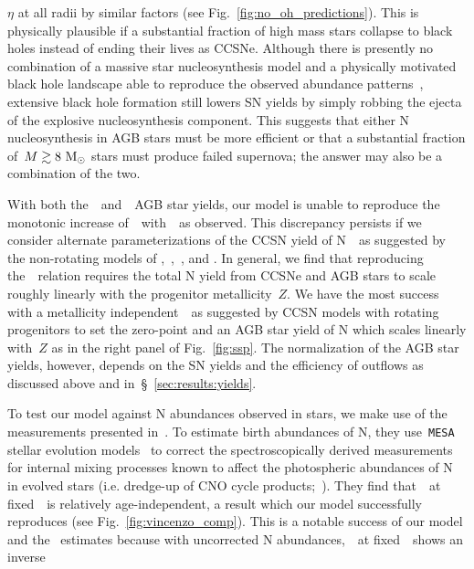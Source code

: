 \documentclass[ms.tex]{subfiles}
\begin{document}
$\eta$ at all radii by similar factors (see Fig.~\ref{fig:no_oh_predictions}).
This is physically plausible if a substantial fraction of high mass stars
collapse to black holes instead of ending their lives as CCSNe.
Although there is presently no combination of a massive star nucleosynthesis
model and a physically motivated black hole landscape able to reproduce the
observed abundance patterns~\citep{Griffith2021a}, extensive black hole
formation still lowers SN yields by simply robbing the ejecta of the explosive
nucleosynthesis component.
This suggests that either N nucleosynthesis in AGB stars must be more efficient 
or that a substantial fraction of~$M \gtrsim 8~\text{M}_\odot$ stars must produce
failed supernova; the answer may also be a combination of the two.
\par
With both the~\karakasten~and~\karakas~AGB star yields, our model is
unable to reproduce the monotonic increase of~\no~with~\oh~as observed.
This discrepancy persists if we consider alternate parameterizations of the
CCSN yield of N~~as suggested by the non-rotating models of
\citet{Woosley1995},~\citet{Nomoto2013},~\citet{Sukhbold2016}, and
\citet{Limongi2018}.
In general, we find that reproducing the~\ohno~relation requires the total N
yield from CCSNe and AGB stars to scale roughly linearly with the progenitor
metallicity~$Z$.
We have the most success with a metallicity independent~~as suggested
by CCSN models with rotating progenitors to set the zero-point and an AGB
star yield of N which scales linearly with~$Z$ as in the right panel of
Fig.~\ref{fig:ssp}.
The normalization of the AGB star yields, however, depends on the SN yields and
the efficiency of outflows as discussed above and
in~\S~\ref{sec:results:yields}.
\par
To test our model against N abundances observed in stars, we make use of the
measurements presented in~\citet{Vincenzo2021}.
To estimate birth abundances of N, they use~\texttt{MESA} stellar evolution
models~\citep{Paxton2011, Paxton2013, Paxton2015, Paxton2018} to correct the
spectroscopically derived measurements for internal mixing processes known to
affect the photospheric abundances of N in evolved stars (i.e. dredge-up of
CNO cycle products;~\citealp{Gilroy1989, Korn2007, Lind2008, Souto2018,
Souto2019}).
They find that~\no~at fixed~\feh~is relatively age-independent, a result
which our model successfully reproduces (see Fig.~\ref{fig:vincenzo_comp}).
This is a notable success of our model and the~\citet{Vincenzo2021} estimates
because with uncorrected N abundances,~\no~at fixed~\feh~shows an inverse
\end{document}
